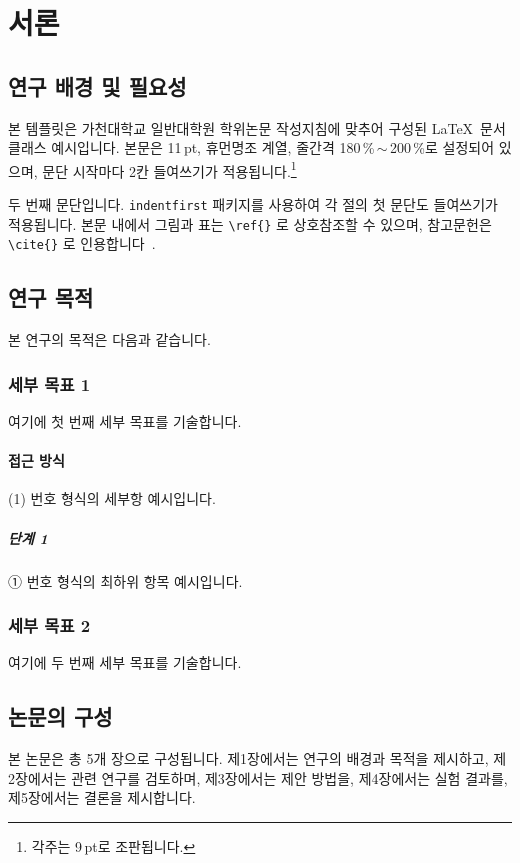 \chapter{서\quad 론}
\label{ch:introduction}

\section{연구 배경 및 필요성}

본 템플릿은 가천대학교 일반대학원 학위논문 작성지침에 맞추어 구성된
\LaTeX\ 문서클래스 예시입니다. 본문은 11\,pt, 휴먼명조 계열, 줄간격
180\,\%\,$\sim$\,200\,\%로 설정되어 있으며, 문단 시작마다 2칸
들여쓰기가 적용됩니다.\footnote{각주는 9\,pt로 조판됩니다.}

두 번째 문단입니다. \texttt{indentfirst} 패키지를 사용하여 각 절의 첫 문단도
들여쓰기가 적용됩니다. 본문 내에서 그림과 표는 \verb|\ref{}| 로 상호참조할 수
있으며, 참고문헌은 \verb|\cite{}| 로 인용합니다~\cite{sample2026}.

\section{연구 목적}

본 연구의 목적은 다음과 같습니다.

\subsection{세부 목표 1}

여기에 첫 번째 세부 목표를 기술합니다.

\subsubsection{접근 방식}

(1) 번호 형식의 세부항 예시입니다.

\paragraph{단계 1} ① 번호 형식의 최하위 항목 예시입니다.

\subsection{세부 목표 2}

여기에 두 번째 세부 목표를 기술합니다.

\section{논문의 구성}

본 논문은 총 5개 장으로 구성됩니다. 제1장에서는 연구의 배경과 목적을
제시하고, 제2장에서는 관련 연구를 검토하며, 제3장에서는 제안 방법을,
제4장에서는 실험 결과를, 제5장에서는 결론을 제시합니다.
